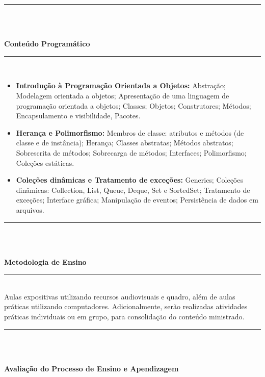 \noindent\rule{16.5cm}{0.4pt}\\
\\
\vspace{-12mm}
\begin{center}\textbf{Conteúdo Programático}\end{center}
\vspace{-5mm}
\noindent\rule{16.5cm}{0.4pt}
\\
\begin{itemize}
 \item \textbf{Introdução à Programação Orientada a Objetos:} Abstração; Modelagem orientada a objetos; Apresentação de uma linguagem de programação orientada a objetos;	Classes; Objetos; Construtores; Métodos; Encapsulamento e visibilidade, Pacotes.


 \item \textbf{Herança e Polimorfismo:} Membros de classe: atributos e métodos (de classe e de instância); Herança;	Classes abstratas; Métodos abstratos; Sobrescrita de métodos; Sobrecarga de métodos; Interfaces;	Polimorfismo; Coleções estáticas.

 \item \textbf{Coleções dinâmicas e Tratamento de exceções:} Generics; Coleções dinâmicas: Collection, List, Queue, Deque, Set e SortedSet; Tratamento de exceções; Interface gráfica; Manipulação de eventos; Persistência de dados em arquivos.
\end{itemize}
\noindent\rule{16.5cm}{0.4pt}\\
\\
\vspace{-12mm}
\begin{center}\textbf{Metodologia de Ensino}\end{center} 
\vspace{-5mm}
\noindent\rule{16.5cm}{0.4pt}
\\
   Aulas expositivas utilizando recursos audiovisuais e quadro, além de aulas práticas utilizando computadores. Adicionalmente, serão realizadas atividades práticas individuais ou em grupo, para consolidação do conteúdo ministrado.\\
\noindent\rule{16.5cm}{0.4pt}\\
\\
\vspace{-12mm}
\begin{center}\textbf{Avaliação do Processo de Ensino e Apendizagem}\end{center}
